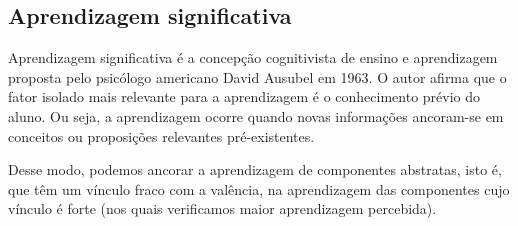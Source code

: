 \subsection{Aprendizagem significativa}\label{sec:as}

Aprendizagem significativa \cite{Pelizzari2002} é a concepção cognitivista de ensino e aprendizagem proposta pelo psicólogo americano David Ausubel em 1963.
O autor afirma que o fator isolado mais relevante para a aprendizagem é o conhecimento prévio do aluno.
Ou seja, a aprendizagem ocorre quando novas informações ancoram-se em conceitos ou proposições relevantes pré-existentes.

Desse modo, podemos ancorar a aprendizagem de componentes abstratas, isto é, que têm um vínculo fraco com a valência, na aprendizagem das componentes cujo vínculo é forte (nos quais verificamos maior aprendizagem percebida).


